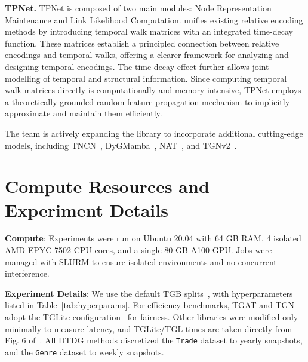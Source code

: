 \textbf{TPNet.} TPNet is composed of two main modules: Node Representation Maintenance and Link Likelihood Computation. \cite{tpnet} unifies existing relative encoding methods by introducing temporal walk matrices with an integrated time-decay function. These matrices establish a principled connection between relative encodings and temporal walks, offering a clearer framework for analyzing and designing temporal encodings. The time-decay effect further allows joint modelling of temporal and structural information. Since computing temporal walk matrices directly is computationally and memory intensive, TPNet employs a theoretically grounded random feature propagation mechanism to implicitly approximate and maintain them efficiently.

The \name team is actively expanding the library to incorporate additional cutting-edge models, including TNCN~\citep{tncn}, DyGMamba~\citep{dygmamba}, NAT~\citep{nat}, and TGNv2~\citep{tgnv2}.

\section{Compute Resources and Experiment Details}
\label{app:details}

\textbf{Compute}: Experiments were run on Ubuntu 20.04 with 64 GB RAM, 4 isolated AMD EPYC 7502 CPU cores, and a single 80 GB A100 GPU. Jobs were managed with SLURM to ensure isolated environments and no concurrent interference.

\textbf{Experiment Details}: We use the default TGB splits~\citep{huang2023temporal, tgb2}, with hyperparameters listed in Table~\ref{tab:hyperparams}. For efficiency benchmarks, TGAT and TGN adopt the TGLite configuration~\citep{10.1145/3620665.3640414} for fairness. Other libraries were modified only minimally to measure latency, and TGLite/TGL times are taken directly from Fig. 6 of~\citep{10.1145/3620665.3640414}. All DTDG methods discretized the \texttt{Trade} dataset to yearly snapshots, and the \texttt{Genre} dataset to weekly snapshots.

